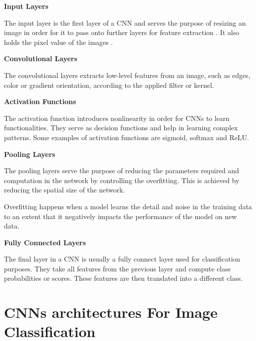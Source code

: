             
           \par \textbf{Input Layers}
           \par The input layer is the first layer of a CNN and serves the purpose of resizing an image in order for it  to pass onto further layers for feature extraction \cite{Ribeiro}. It also holds the pixel value of the images \cite{OShea2015}. \bigbreak
            
          
           \par \textbf{Convolutional Layers}
           \par The convolutional layers extracts low-level features from an image, such as edges, color or gradient orientation, according to the applied filter or kernel. \cite{Ribeiro} \bigbreak

           \par \textbf{Activation Functions}
           \par The activation function introduces nonlinearity in order for CNNs to learn functionalities. They serve as decision functions and help in learning complex patterns. Some examples of activation functions are sigmoid, softmax and ReLU. \cite{Ribeiro} \bigbreak

           \par \textbf{Pooling Layers} 
           \par The pooling layers serve the purpose of reducing the parameters required and computation in the network by controlling the overfitting. This is achieved by reducing the spatial size of the network. \cite{Ribeiro}
           \par Overfitting happens when a model learns the detail and noise in the training data to an extent that it negatively impacts the performance of the model on new data. \cite{OShea2015} \bigbreak


           \par \textbf{Fully Connected Layers}
            \par  The final layer in a CNN is usually a fully connect layer used for classification purposes. They take all features from the previous layer and compute class probabilities or scores. These features are then translated into a different class. \cite{Ribeiro} \bigbreak
            
            
\section{CNNs architectures For Image Classification}
\label{sec:cnn}
